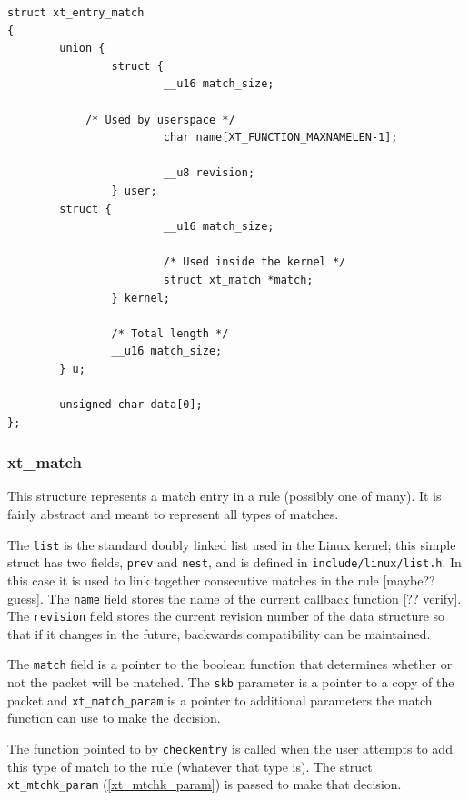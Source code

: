 \documentclass[a4paper,10pt]{article}
\newcommand{\code}[1]{\texttt{#1}}
\begin{document}
\begin{lstlisting}
struct xt_entry_match
{
        union {
                struct {
                        __u16 match_size;

			/* Used by userspace */
                        char name[XT_FUNCTION_MAXNAMELEN-1];

                        __u8 revision;
                } user;
		struct {
                        __u16 match_size;

                        /* Used inside the kernel */
                        struct xt_match *match;
                } kernel;

                /* Total length */
                __u16 match_size;
        } u;

        unsigned char data[0];
};
\end{lstlisting}

\subsubsection{xt\_match}\label{xt_match}
This structure represents a match entry in a rule (possibly one of
many). It is fairly abstract and meant to represent all types of
matches.

The \code{list} is the standard doubly linked list used in
the Linux kernel; this simple struct has two fields, \code{prev} and
\code{nest}, and  is defined in \code{include/linux/list.h}. In this
case it is used to link together consecutive matches in the rule
[maybe?? guess]. The \code{name} field stores the name of the current
callback function [?? verify]. The \code{revision} field stores the
current revision number of the data structure so that if it changes in
the future, backwards compatibility can be maintained.

The \code{match} field is a pointer to the boolean function that
determines whether or not the packet will be matched. The \code{skb}
parameter is a pointer to a copy of the packet and
\code{xt\_match\_param} is a pointer to additional parameters the
match function can use to make the decision.

The function pointed to by \code{checkentry} is called when the user
attempts to add this type of match to the rule (whatever that type is). The struct
\code{xt\_mtchk\_param} (\ref{xt_mtchk_param}) is passed to make that decision. 
\end{document}
